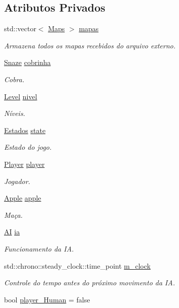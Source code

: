 \subsection*{Atributos Privados}
\begin{DoxyCompactItemize}
\item 
std\+::vector$<$ \hyperlink{classMaps}{Maps} $>$ \hyperlink{classSnazeGame_a0bae7bc31a288d55714d90f574cc8bd1}{mapas}
\begin{DoxyCompactList}\small\item\em Armazena todos os mapas recebidos do arquivo externo. \end{DoxyCompactList}\item 
\hyperlink{classSnaze}{Snaze} \hyperlink{classSnazeGame_a86f1f0364ec7e8fe6559418236ea7e04}{cobrinha}
\begin{DoxyCompactList}\small\item\em Cobra. \end{DoxyCompactList}\item 
\hyperlink{classLevel}{Level} \hyperlink{classSnazeGame_a5940b3ae2bdfe8ad2c38d8144a77e9b2}{nivel}
\begin{DoxyCompactList}\small\item\em Níveis. \end{DoxyCompactList}\item 
\hyperlink{classSnazeGame_a10ea6cb420042fdbfcade4f0261af5c1}{Estados} \hyperlink{classSnazeGame_aa0305588eeb6fee59039ba51df01ebc2}{state}
\begin{DoxyCompactList}\small\item\em Estado do jogo. \end{DoxyCompactList}\item 
\hyperlink{classPlayer}{Player} \hyperlink{classSnazeGame_a61268a99fe9578f17b7b6565349aa5a9}{player}
\begin{DoxyCompactList}\small\item\em Jogador. \end{DoxyCompactList}\item 
\hyperlink{classApple}{Apple} \hyperlink{classSnazeGame_a346b1696a5d5807c012e4b24bbba1e8b}{apple}
\begin{DoxyCompactList}\small\item\em Maça. \end{DoxyCompactList}\item 
\hyperlink{classAI}{AI} \hyperlink{classSnazeGame_adaf01e03323aed1a69936416e5aa44db}{ia}
\begin{DoxyCompactList}\small\item\em Funcionamento da IA. \end{DoxyCompactList}\item 
std\+::chrono\+::steady\+\_\+clock\+::time\+\_\+point \hyperlink{classSnazeGame_a394c65f61b0cf9c4a5fc5a24d0b5b4f4}{m\+\_\+clock}
\begin{DoxyCompactList}\small\item\em Controle do tempo antes do próximo movimento da IA. \end{DoxyCompactList}\item 
bool \hyperlink{classSnazeGame_accfde443b3ec29be803b24cda85fd4fe}{player\+\_\+\+Human} = false
\end{DoxyCompactItemize}


